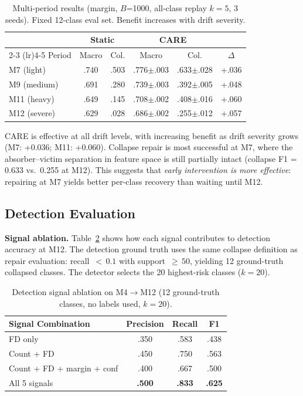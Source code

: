 \documentclass[journal]{IEEEtran}
\newcommand{\ours}{CARE}  %
\begin{document}
\begin{table}[t]
\centering
\caption{Multi-period results (margin, $B$=1000, all-class replay $k{=}5$, 3 seeds). Fixed 12-class eval set. Benefit increases with drift severity.}
\label{tab:multiperiod}
\scriptsize
\setlength{\tabcolsep}{3pt}
\begin{tabular}{@{}l cc cc c@{}}
\toprule
& \multicolumn{2}{c}{Static} & \multicolumn{2}{c}{\ours{}} & \\
\cmidrule(lr){2-3} \cmidrule(lr){4-5}
Period & Macro & Col. & Macro & Col. & $\Delta$ \\
\midrule
M7 (light)   & .740 & .503 & .776$\pm$.003 & .633$\pm$.028 & +.036 \\
M9 (medium)  & .691 & .280 & .739$\pm$.003 & .392$\pm$.005 & +.048 \\
M11 (heavy)  & .649 & .145 & .708$\pm$.002 & .408$\pm$.016 & +.060 \\
M12 (severe) & .629 & .028 & .686$\pm$.002 & .255$\pm$.012 & +.057 \\
\bottomrule
\end{tabular}
\end{table}

\ours{} is effective at all drift levels, with increasing benefit as drift severity grows (M7: +0.036; M11: +0.060).
Collapse repair is most successful at M7, where the absorber--victim separation in feature space is still partially intact (collapse F1 = 0.633 vs.\ 0.255 at M12).
This suggests that \textit{early intervention is more effective}: repairing at M7 yields better per-class recovery than waiting until M12.

\subsection{Detection Evaluation}
\label{sec:detection_eval}

\textbf{Signal ablation.}
Table~\ref{tab:detect_signals} shows how each signal contributes to detection accuracy at M12.
The detection ground truth uses the same collapse definition as repair evaluation: recall~${<}\,0.1$ with support~${\geq}\,50$, yielding 12 ground-truth collapsed classes.
The detector selects the 20 highest-risk classes ($k{=}20$).

\begin{table}[t]
\centering
\caption{Detection signal ablation on M4$\to$M12 (12 ground-truth classes, no labels used, $k{=}20$).}
\label{tab:detect_signals}
\small
\begin{tabular}{@{}l ccc@{}}
\toprule
Signal Combination & Precision & Recall & F1 \\
\midrule
FD only & .350 & .583 & .438 \\
Count + FD & .450 & .750 & .563 \\
Count + FD + margin + conf & .400 & .667 & .500 \\
All 5 signals & \textbf{.500} & \textbf{.833} & \textbf{.625} \\
\bottomrule
\end{tabular}
\end{table}
\end{document}
